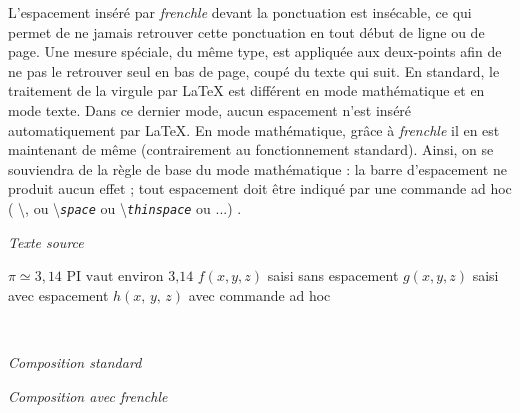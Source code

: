 \documentclass[a4paper,12pt,openright]{article}
\begin{document}
L’espacement inséré par \textit{frenchle} devant la ponctuation est insécable, ce qui
permet de ne jamais retrouver cette ponctuation en tout début de ligne ou de
page. Une mesure spéciale, du même type, est appliquée aux deux-points afin
de ne pas le retrouver seul en bas de page, coupé du texte qui suit.
En standard, le traitement de la virgule par \LaTeX{} est différent en mode
mathématique et en mode texte. Dans ce dernier mode, aucun espacement n’est
inséré automatiquement par \LaTeX. En mode mathématique, grâce à \textit{frenchle}
il en est maintenant de même (contrairement au fonctionnement standard).
Ainsi, on se souviendra de la règle de base du mode mathématique : la barre
d’espacement ne produit aucun effet ; tout espacement doit être indiqué par une
commande ad hoc ( \backslash, 
ou \backslash\texttt{\textit{space}}  
ou  \backslash\texttt{\textit{thinspace}} ou ...) .


\begin{center}
\textit{Texte source}\\[1ex]
\begin{boxedverbatim}
$\pi \simeq 3,14$
$\textrm{PI vaut environ 3,14}$
$f(x,y,z)$ saisi sans espacement
$g(x, y, z)$ saisi avec espacement
$h(x,\,y,\,z)$ avec commande ad hoc
\end{boxedverbatim}
\\[0.3ex]
\begin{minipage}{70mm}
\begin{center}
\textit{Composition standard}
\end{center}
\end{minipage}
\begin{minipage}{65mm}
\begin{center}
\textit{Composition avec frenchle}
\end{center}
\end{minipage}
\end{center}
\rule{0pt}{1em}
\end{document}
